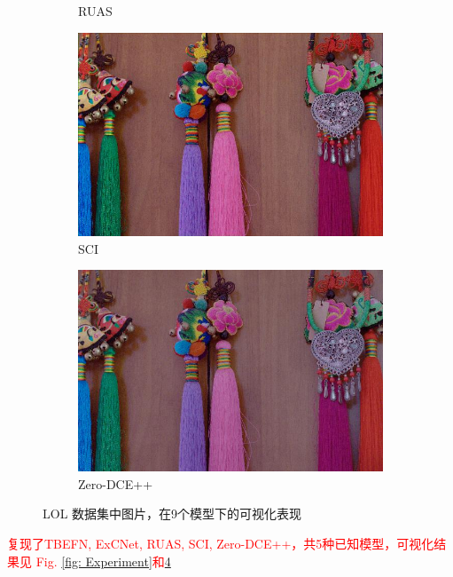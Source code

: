 \documentclass[a4paper]{ctexart}
\begin{document}
\begin{figure}[htb]
\begin{subfigure}{0.19\textwidth}
				\captionsetup{font=scriptsize}
				\caption{RUAS}
				\label{fig: RUAS1}
			\end{subfigure}
			\begin{subfigure}{0.19\textwidth}
				\includegraphics[width=\linewidth]{picture/LLIE/Experiment/SCI1}
				\captionsetup{font=scriptsize}
				\caption{SCI}
				\label{fig: SCI1}
			\end{subfigure}
			\begin{subfigure}{0.19\textwidth}
				\includegraphics[width=\linewidth]{picture/LLIE/Experiment/Zero-DCE++1}
				\captionsetup{font=scriptsize}
				\caption{Zero-DCE++}
				\label{fig: Zero-DCE++1}
			\end{subfigure}
		\caption{
			\label{fig: Experiment1}
			LOL 数据集中图片，在9个模型下的可视化表现
		}
		\end{figure}
		
		\textcolor{red}{复现了TBEFN, ExCNet, RUAS, SCI, Zero-DCE++，共5种已知模型，可视化结果见 Fig. \ref{fig: Experiment}和\ref{fig: Experiment1}}
		
\end{document}
